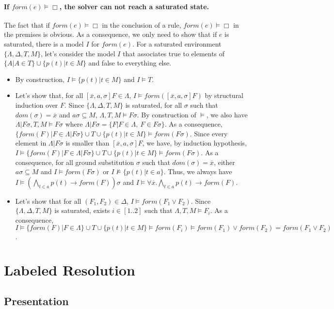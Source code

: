 \documentclass[a4paper,10pt]{report}
\newcommand{\F}{\mathit{form}}
\begin{document}
\subsubsection*{If $\F(e)\vDash\Box$, the solver can not reach a saturated state.}
The fact that if $\F(e)\vDash\Box$ in the conclusion of a rule, $\F(e)\vDash\Box$ in the premises
is obvious. As a consequence, we only need to show that if $e$ is saturated, there is a model $I$
for $\F(e)$. For a saturated environment $\{\Lambda,\Delta,T,M\}$, let's consider the model $I$
that associates true to elements of $\{A|A\in T\}\cup\{p(t)|t\in M\}$ and false to everything else.
\begin{itemize}
 \item By construction, $I\vDash\{p(t)|t\in M\}$ and $I\vDash T$.
 \item Let's show that, for all $[\overline x,a,\sigma]F\in\Lambda$, 
$I\vDash\F([\overline x,a,\sigma]F)$ by structural induction over $F$.
Since $\{\Lambda,\Delta,T,M\}$ is saturated, for all $\sigma$ such that
$dom(\sigma)=\overline x$ and $a\sigma\subseteq M$, $\Lambda,T,M\vDash F\sigma$.
By construction of $\vDash$, we also have $\Lambda|F\sigma,T,M\vDash F\sigma$ where
$\Lambda|F\sigma=\{F|F\in\Lambda,\ F\in F\sigma\}$.
As a consequence, $\{\F(F)|F\in\Lambda|F\sigma\}\cup T\cup\{p(t)|t\in M\}\vDash\F(F\sigma)$.
Since every element in $\Lambda|F\sigma$ is smaller than $[\overline x,a,\sigma]F$, 
we have, by induction hypothesis,
$I\vDash\{\F(F)|F\in\Lambda|F\sigma\}\cup T\cup\{p(t)|t\in M\}\vDash\F(F\sigma)$.
As a consequence, for all ground substitution $\sigma$ such that $dom(\sigma)=\overline x$,
either $a\sigma\subseteq M$ and $I\vDash\F(F\sigma)$ or $I\nvDash\{p(t)|t\in a\}$.
Thus, we always have $I\vDash(\bigwedge_{t\in a} p(t)\rightarrow\F(F))\sigma$ and
$I\vDash\forall \overline x.\bigwedge_{t\in a} p(t)\rightarrow\F(F)$.
 \item Let's show that for all $(F_1,F_2)\in\Delta$, $I\vDash\F(F_1\vee F_2)$. Since
$\{\Lambda,\Delta,T,M\}$ is saturated, exists $i\in[1..2]$ such that $\Lambda,T,M\vDash F_i$.
As a consequence, $I\vDash\{\F(F)|F\in\Lambda\}\cup T\cup\{p(t)|t\in M\}\vDash
\F(F_i)\vDash\F(F_1)\vee\F(F_2)=\F(F_1\vee F_2)$.
\end{itemize}

\chapter{Labeled Resolution}
\section{Presentation}
\end{document}
